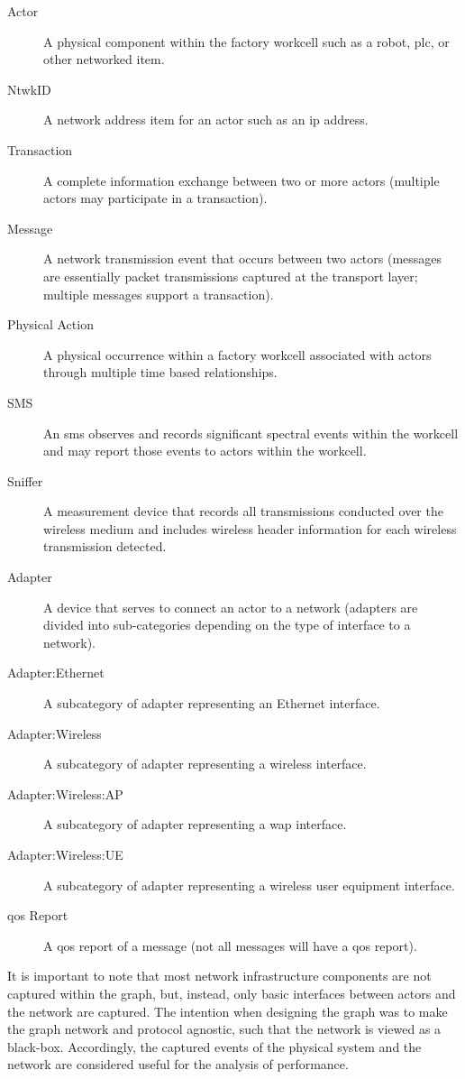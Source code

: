 \begin{description}%
    \item[Actor]  A physical component within the factory workcell such as a robot, \gls{plc}, or other networked item.
    \item[NtwkID] A network address item for an actor such as an \gls{ip} address.
    \item[Transaction] A complete information exchange between two or more actors (multiple actors may participate in a transaction).
    \item[Message] A network transmission event that occurs between two actors (messages are essentially packet transmissions captured at the transport layer; multiple messages support a transaction).
    \item[Physical Action]  A physical occurrence within a factory workcell associated with actors through multiple time based relationships.
    \item[SMS] An \gls{sms} observes and records significant spectral events within the workcell and may report those events to actors within the workcell.  
    \item[Sniffer] A measurement device that records all transmissions conducted over the wireless medium and includes wireless header information for each wireless transmission detected.
    \item[Adapter] A device that serves to connect an actor to a network (adapters are divided into sub-categories depending on the type of interface to a network).
    \item[Adapter:Ethernet] A subcategory of adapter representing an Ethernet interface. 
    \item[Adapter:Wireless] A subcategory of adapter representing a wireless interface. 
    \item[Adapter:Wireless:AP]  A subcategory of adapter representing a \gls{wap} interface.
    \item[Adapter:Wireless:UE] A subcategory of adapter representing a wireless user equipment interface.
    \item[\Gls{qos} Report] A \gls{qos} report of a message (not all messages will have a \gls{qos} report).
\end{description}

It is important to note that most network infrastructure components are not captured within the graph, but, instead, only basic interfaces between actors and the network are captured.  The intention when designing the graph was to make the graph network and protocol agnostic, such that the network is viewed as a black-box. Accordingly, the captured events of the physical system and the network are considered useful for the analysis of performance. 

